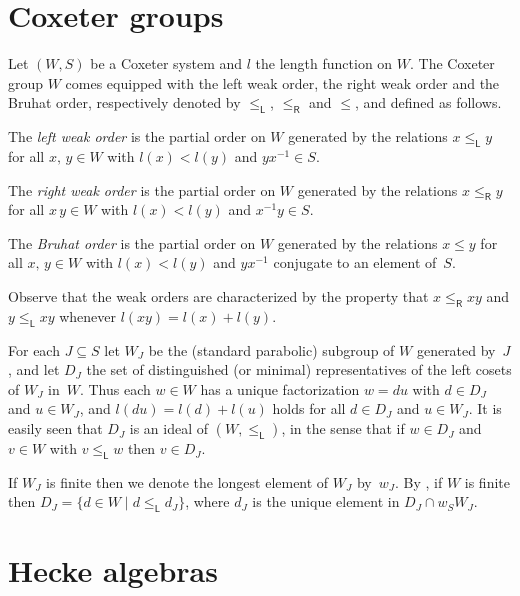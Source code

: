 \documentclass[ALCO,ThmDefs,Unicode,epreuves]{cedram}
\newcommand{\lside}{_{\mathsf{L}}}
\newcommand{\rside}{_{\mathsf{R}}}
\begin{document}
\section{Coxeter groups}
\label{sec:2}
Let $(W,S)$ be a Coxeter system and $l$ the length function on $W$.
The Coxeter group $W$ comes equipped with the left weak
order, the right weak order and the Bruhat order, respectively denoted by
$\leqslant\lside$, $\leqslant\rside$ and $\leqslant$, and defined as follows.

\begin{defi}\label{Orders_on_W}
The \emph{left weak order} is the partial order on $W$ generated by
the relations $x\leqslant\lside y$ for all $x,\,y\in W$
with $l(x)<l(y)$ and $yx^{-1}\in S$.

The \emph{right weak order} is the partial order on $W$ generated by
the relations $x\leqslant\rside y$ for all $x\,y\in W$
with $l(x)<l(y)$ and $x^{-1}y\in S$.

The \emph{Bruhat order} is the partial order on $W$ generated by
the relations $x\leqslant y$ for all $x,\,y\in W$
with $l(x)<l(y)$ and $yx^{-1}$ conjugate to an element of~$S$.
\end{defi}

Observe that the weak orders are characterized by the property that
$x\leqslant\rside xy$ and $y\leqslant\lside xy$ whenever $l(xy)=l(x)+l(y)$.

For each $J\subseteq S$ let $W_{J}$ be the (standard parabolic)
subgroup of $W$ generated by~$J$, and let $D_{J}$ the set of
distinguished (or minimal) representatives of the left cosets of
$W_{J}$ in~$W$. Thus each $w \in W$ has a unique factorization
$w = du$ with $d \in D_{J}$ and $u \in W_{J}$, and $l(du) = l(d) +l(u)$
holds for all $d \in D_{J}$ and $u \in W_{J}$. It is easily seen
that $D_J$ is an ideal of $(W,\leqslant\lside)$, in the sense that if
$w\in D_J$ and $v\in W$ with $v\leqslant\lside w$ then $v\in D_J$.

If $W_J$ is finite then we denote the longest element of $W_{J}$
by~$w_{J}$. By \cite[Lemma~2.2.1]{gecpfei:charHecke}, if $W$ is finite then
$D_{J} = \{d\in W\mid d\leqslant\lside d_J\}$, where $d_{J}$ is
the unique element in $D_{J} \cap w_{S}W_{J}$.

\section{Hecke algebras}
\label{sec:2'}
\end{document}
